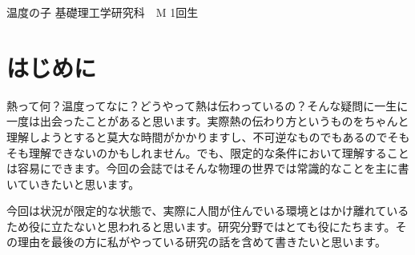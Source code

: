 \documentclass[10pt,b5paper,papersize,dvipdfmx]{jsbook}
\begin{document}


\kaishititle%
  {温度の子}%
  {基礎理工学研究科　M 1回生}%
  {}%


\section*{はじめに}
熱って何？温度ってなに？どうやって熱は伝わっているの？そんな疑問に一生に一度は出会ったことがあると思います。実際熱の伝わり方というものをちゃんと理解しようとすると莫大な時間がかかりますし、不可逆なものでもあるのでそもそも理解できないのかもしれません。でも、限定的な条件において理解することは容易にできます。今回の会誌ではそんな物理の世界では常識的なことを主に書いていきたいと思います。\par
今回は状況が限定的な状態で、実際に人間が住んでいる環境とはかけ離れているため役に立たないと思われると思います。研究分野ではとても役にたちます。その理由を最後の方に私がやっている研究の話を含めて書きたいと思います。


%
\end{document}
